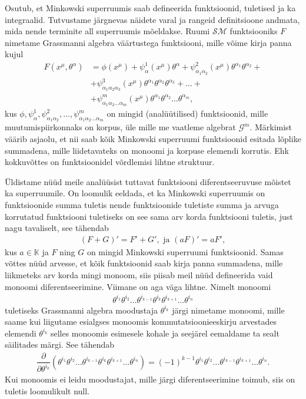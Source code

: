 \documentclass[12pt,a4paper,oneside]{article}
\theoremstyle{plain}
\theoremstyle{definition}
\numberwithin{equation}{section}
\def\K{{\mathbb K}}
\def\G{{\mathcal G}}
\def\SM{{\mathcal {SM}}}
\begin{document}
Osutub, et Minkowski superruumis saab defineerida 
funktsioonid, tuletised ja ka integraalid. Tutvustame 
järgnevas näidete varal ja rangeid definitsioone andmata, 
mida nende terminite all superruumis mõeldakse. Ruumi $\SM$ 
funktsiooniks $F$ nimetame Grassmanni algebra väärtustega 
funktsiooni, mille võime kirja panna kujul
\begin{align*}
F \left(x^{\mu}, \theta^{\alpha} \right) &= 
\phi \left(x^{\mu}\right) + 
\psi_{\alpha}^{1} \left(x^{\mu}\right) \theta^{\alpha} + 
\psi_{\alpha_1 \alpha_2}^{2} \left(x^{\mu}\right) 
	\theta^{\alpha_1} \theta^{\alpha_2} + \\
&+ \psi_{\alpha_1 \alpha_2 \alpha_3}^{3} \left(x^{\mu}\right) 
	\theta^{\alpha_1} \theta^{\alpha_2} \theta^{\alpha_3} + 
\ldots + \\
&+ \psi_{\alpha_1 \alpha_2 \ldots \alpha_m}^{m} 
	\left(x^{\mu}\right) \theta^{\alpha_1} \theta^{\alpha_2} 
	\ldots \theta^{\alpha_m}, 
\end{align*}
kus $\phi, \psi_{\alpha}^{1}, \psi_{\alpha_1 \alpha_2}^{2}, 
\ldots, \psi_{\alpha_1 \alpha_2 \ldots \alpha_m}^{m}$ on mingid 
(analüütilised) funktsioonid, mille muutumispiirkonnaks on 
korpus, üle mille me vaatleme algebrat $\G^m$. Märkimist väärib 
asjaolu, et nii saab kõik Minkowski superruumi 
funktsioonid esitada lõplike summadena, mille liidetavateks on 
monoomi ja korpuse elemendi korrutis. Ehk kokkuvõttes on 
funktsioonidel võrdlemisi lihtne struktuur. 

Üldistame nüüd meile analüüsist tuttavat funktsiooni 
diferentseeruvuse mõistet ka superruumile. On loomulik eeldada, 
et ka Minkowski superruumis on funktsioonide summa tuletis 
nende funktsioonide tuletiste summa ja arvuga korrutatud funktsiooni 
tuletiseks on see sama arv korda funktsiooni tuletis, just nagu 
tavaliselt, see tähendab
\begin{align*}
\left(F + G\right)' = F' + G', \text{ ja } \left(aF\right)' = aF',
\end{align*}
kus $a \in \K$ ja $F$ ning $G$ on mingid Minkowski superruumi 
funktsioonid. Samas võttes nüüd arvesse, et kõik funktsioonid 
saab kirja panna summadena, mille liikmeteks arv korda mingi 
monoom, siis piisab meil nüüd defineerida vaid monoomi 
diferentseerimine. Viimane on aga väga lihtne. Nimelt 
monoomi 
\begin{align*}
\theta^{i_1} \theta^{i_2} \ldots \theta^{i_{k-1}} 
\theta^{i_k} \theta^{i_{k+1}} \ldots \theta^{i_n}
\end{align*}
tuletiseks Grassmanni algebra moodustaja $\theta^{i_k}$ järgi 
nimetame monoomi, mille saame kui liigutame esialgses monoomis
kommutatsioonieeskirju arvestades elemendi $\theta^{i_k}$ selles 
monoomis esimesele kohale ja seejärel eemaldame ta sealt 
säilitades märgi. See tähendab
\begin{align*}
\dfrac{\partial}{\partial \theta^{i_k}} \left(
\theta^{i_1} \theta^{i_2} \ldots \theta^{i_{k-1}} 
\theta^{i_k} \theta^{i_{k+1}} \ldots \theta^{i_n}
\right) = 
\left(-1\right)^{k-1} \theta^{i_1} \theta^{i_2} \ldots 
\theta^{i_{k-1}} \theta^{i_{k+1}} \ldots \theta^{i_n}.
\end{align*}
Kui monoomis ei leidu moodustajat, mille järgi 
diferentseerimine toimub, siis on tuletis loomulikult null.
\end{document}

